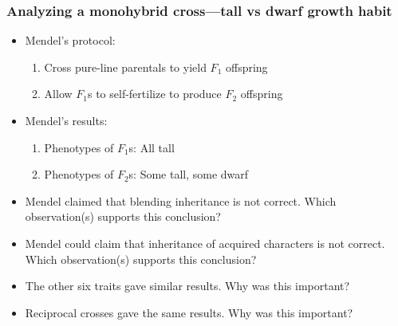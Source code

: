 \begin{frame}
    \frametitle{Analyzing a monohybrid cross---tall vs dwarf growth habit}

    \begin{itemize}
        \item<1-> Mendel's  protocol:
            \begin{enumerate}
                \item<1-> Cross pure-line parentals to yield $F_1$ offspring
                \item<1-> Allow $F_1$s to self-fertilize to produce $F_2$ offspring
            \end{enumerate}

        \item<2-> Mendel's results:
            \begin{enumerate}
                \item<2-> Phenotypes of $F_1$s: All tall
                \item<2-> Phenotypes of $F_2$s: Some tall, some dwarf
            \end{enumerate}
    \end{itemize}

\end{frame}

\begin{frame}
    \begin{itemize}
        \item Mendel claimed that blending inheritance is not correct. Which
            observation(s) supports this conclusion?

        \item Mendel could claim that inheritance of acquired characters is not
            correct. Which observation(s) supports this conclusion?

        \item The other six traits gave similar results. Why was this
            important?

        \item Reciprocal crosses gave the same results. Why was this important?
    \end{itemize}
\end{frame}

